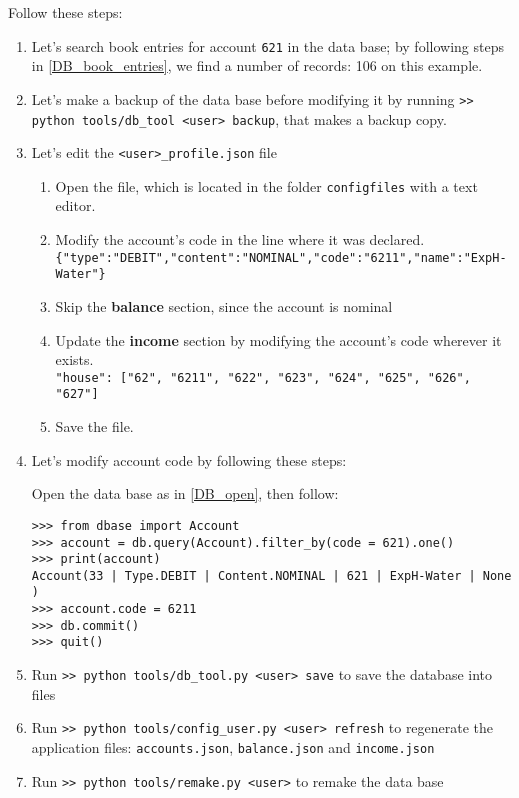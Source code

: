 \documentclass[12pt, a4paper]{article}
\begin{document}
Follow these steps:
\begin{enumerate}
\item Let's search book entries for account \verb!621! in the data base; by following steps in  \ref{DB_book_entries}, we find a number of records:  106 on this example. 
\item Let's make a backup of the data base before modifying it by running 
\verb!>> python tools/db_tool <user> backup!, that makes a backup copy.
\item Let's edit the \verb!<user>_profile.json! file
\begin{enumerate}
 \item Open the file, which is located in the folder \verb!configfiles! with a text editor.
 \item Modify the account's code in the line where it was declared. \\
 \verb!{"type":"DEBIT","content":"NOMINAL","code":"6211","name":"ExpH-Water"}!
 \item Skip the \textbf{balance} section, since the account is nominal
 \item Update the \textbf{income} section by modifying the account's code wherever it exists.\\
 \verb!"house": ["62", "6211", "622", "623", "624", "625", "626", "627"]!
 \item Save the file.
\end{enumerate}
\item Let's modify account code by following these steps:
 
Open the data base as in \ref{DB_open}, then follow:
\begin{verbatim}
>>> from dbase import Account
>>> account = db.query(Account).filter_by(code = 621).one()
>>> print(account)
Account(33 | Type.DEBIT | Content.NOMINAL | 621 | ExpH-Water | None )
>>> account.code = 6211
>>> db.commit()
>>> quit()
\end{verbatim}
\item Run \verb!>> python tools/db_tool.py <user> save! to save the database into files
\item Run \verb!>> python tools/config_user.py <user> refresh! to regenerate the application files: \verb!accounts.json!, \verb!balance.json! and \verb!income.json! 
\item Run \verb!>> python tools/remake.py <user>! to remake the data base
\end{enumerate}
 
\end{document}
